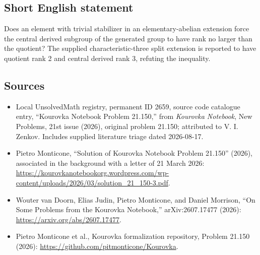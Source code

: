 \documentclass[11pt]{article}
\begin{document}
\subsection{Short English statement}
Does an element with trivial stabilizer in an elementary-abelian extension force the central derived subgroup of the generated group to have rank no larger than the quotient? The supplied characteristic-three split extension is reported to have quotient rank 2 and central derived rank 3, refuting the inequality.
\subsection{Sources}
\begin{itemize}
\item Local UnsolvedMath registry, permanent ID 2659, source code catalogue entry, ``Kourovka Notebook Problem 21.150,'' from \emph{Kourovka Notebook}, New Problems, 21st issue (2026), original problem 21.150; attributed to V. I. Zenkov. Includes supplied literature triage dated 2026-08-17.
\item Pietro Monticone, ``Solution of Kourovka Notebook Problem 21.150'' (2026), associated in the background with a letter of 21 March 2026: \url{https://kourovkanotebookorg.wordpress.com/wp-content/uploads/2026/03/solution_21_150-3.pdf}.
\item Wouter van Doorn, Elias Judin, Pietro Monticone, and Daniel Morrison, ``On Some Problems from the Kourovka Notebook,'' arXiv:2607.17477 (2026): \url{https://arxiv.org/abs/2607.17477}.
\item Pietro Monticone et al., Kourovka formalization repository, Problem 21.150 (2026): \url{https://github.com/pitmonticone/Kourovka}.
\end{itemize}
\end{document}

